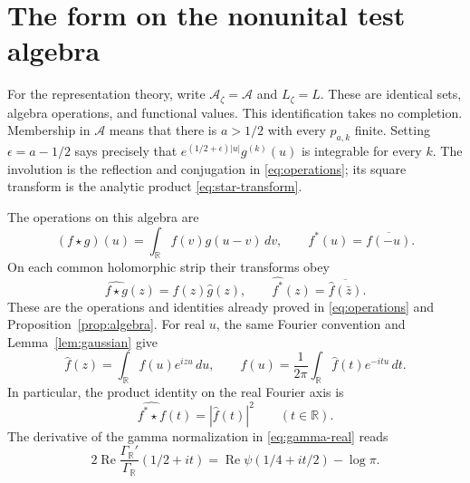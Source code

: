 \documentclass[11pt]{article}
\numberwithin{equation}{section}
\newcommand{\cA}{\mathcal A}
\newcommand{\R}{\mathbb R}
\newcommand{\A}{\mathcal A}
\begin{document}
\section{The form on the nonunital test algebra}
\label{sec:native-form}

For the representation theory, write
$\cA_\zeta=\A$ and $L_\zeta=L$.
These are identical sets, algebra operations, and functional values.
This identification takes no completion.  Membership in $\A$ means that there is
$a>1/2$ with every $p_{a,k}$ finite.  Setting $\epsilon=a-1/2$ says precisely
that $e^{(1/2+\epsilon)|u|}g^{(k)}(u)$ is integrable for every $k$.
The involution is the reflection and conjugation in
\eqref{eq:operations}; its square transform is the analytic product
\eqref{eq:star-transform}.

The operations on this algebra are
\begin{equation}
 (f\star g)(u)=\int_{\R}f(v)g(u-v)\,dv,
 \qquad f^*(u)=\overline{f(-u)}.
 \label{eq:conv}
\end{equation}
On each common holomorphic strip their transforms obey
\begin{equation}
 \widehat{f\star g}(z)=\widehat f(z)\widehat g(z),
 \qquad\widehat{f^*}(z)=\overline{\widehat f(\bar z)}.
 \label{eq:transform}
\end{equation}
These are the operations and identities already proved in
\eqref{eq:operations} and Proposition~\ref{prop:algebra}.
For real $u$, the same Fourier convention and Lemma~\ref{lem:gaussian} give
\begin{equation}
 \widehat f(z)=\int_{\R}f(u)e^{izu}\,du,
 \qquad f(u)=\frac1{2\pi}\int_{\R}\widehat f(t)e^{-itu}\,dt.
 \label{eq:fourier}
\end{equation}
In particular, the product identity on the real Fourier axis is
\begin{equation}
 \widehat{f^*\star f}(t)=|\widehat f(t)|^2\qquad(t\in\R).
 \label{eq:square-transform}
\end{equation}
The derivative of the gamma normalization in \eqref{eq:gamma-real} reads
\begin{equation}
 2\operatorname{Re}\frac{\Gamma_{\R}'}{\Gamma_{\R}}(1/2+it)
 =\operatorname{Re}\psi(1/4+it/2)-\log\pi.
 \label{eq:gamma-normalization}
\end{equation}
\end{document}
